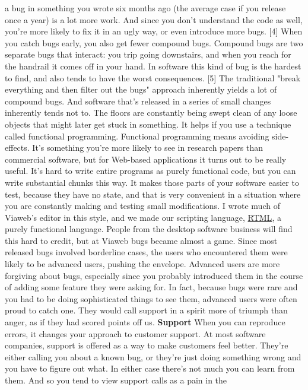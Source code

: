 a bug in something you wrote six months ago (the average case if
you release once a year) is a lot more work.  And since you don't
understand the code as well, you're more likely to fix it in an
ugly way, or even introduce more bugs. [4]
When you catch bugs early, you also get fewer compound bugs.
Compound bugs are two separate bugs that interact:  you trip going
downstairs, and when you reach for the handrail it comes off in
your hand.  In software this kind of bug is the hardest to find,
and also tends to have the worst consequences. [5]  The traditional
"break everything and then filter out the bugs" approach inherently
yields a lot of compound bugs.  And software that's released in a
series of small changes inherently tends not to. The floors are
constantly being swept clean of any loose objects that might later
get stuck in something.
It helps if you use a technique called functional programming.
Functional programming means avoiding side-effects.  It's something
you're more likely to see in research papers than commercial
software, but for Web-based applications it turns out to be really
useful.  It's hard to write entire programs as purely functional
code, but you can write substantial chunks this way.  It makes
those parts of your software easier to test, because they have no
state, and that is very convenient in a situation where you are
constantly making and testing small modifications.  I wrote much
of Viaweb's editor in this style, and we made our scripting language,
\href{http://store.yahoo.com/rtml.html}{RTML}, 
a purely functional language.
People from the desktop software business will find this hard to
credit, but at Viaweb bugs became almost a game.  Since most released
bugs involved borderline cases, the users who encountered them were
likely to be advanced users, pushing the envelope.  Advanced users
are more forgiving about bugs, especially since you probably
introduced them in the course of adding some feature they were
asking for.  In fact, because bugs were rare and you had to be
doing sophisticated things to see them, advanced users were often
proud to catch one.  They would call support in a spirit more of
triumph than anger, as if they had scored points off us.
\textbf{Support}
When you can reproduce errors, it changes your approach to customer
support.  At most software companies, support is offered as a way
to make customers feel better.  They're either calling you about
a known bug, or they're just doing something wrong and you have to
figure out what.  In either case there's not much you can learn
from them.  And so you tend to view support calls as a pain in the
